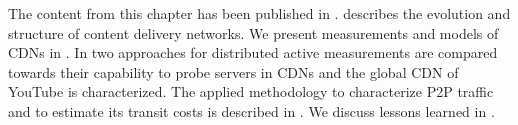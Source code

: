 The content from this chapter has been published in \cite{burger2012profit,burger2014vantage,burger2016hierarchical}.
 describes the evolution and structure of content delivery networks.
We present measurements and models of CDNs in .
In  two approaches for distributed active measurements are compared towards their capability to probe servers in CDNs and the global CDN of YouTube is characterized.
The applied methodology to characterize P2P traffic and to estimate its transit costs is described in .
We discuss lessons learned in .





%

